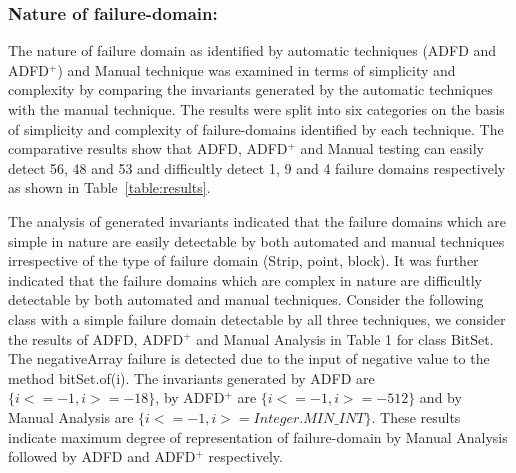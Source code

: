 \subsubsection{Nature of failure-domain:}
The nature of failure domain as identified by automatic techniques (ADFD and ADFD$^+$) and Manual technique was examined in terms of simplicity and complexity by comparing the invariants generated by the automatic techniques with the manual technique. The results were split into six categories on the basis of simplicity and complexity of failure-domains identified by each technique. The comparative results show that ADFD, ADFD$^+$ and Manual testing can easily detect 56, 48 and 53 and difficultly detect 1, 9 and 4 failure domains respectively as shown in Table~\ref{table:results}.

The analysis of generated invariants indicated that the failure domains which are simple in nature are easily detectable by both automated and manual techniques irrespective of the type of failure domain (Strip, point, block). It was further indicated that the failure domains which are complex in nature are difficultly detectable by both automated and manual techniques. %
Consider the following class with a simple failure domain detectable by all three techniques, we consider the results of ADFD, ADFD$^+$ and Manual Analysis in Table 1 for class BitSet. The negativeArray failure is detected due to the input of negative value to the method bitSet.of(i). The invariants generated by ADFD are $\{i <= -1, i >= -18\}$, by ADFD$^+$ are $\{i <= -1, i >= -512\}$ and by Manual Analysis are $\{i <= -1, i >= Integer.MIN\_INT\}$. These results indicate maximum degree of representation of failure-domain by Manual Analysis followed by ADFD and ADFD$^+$ respectively.





